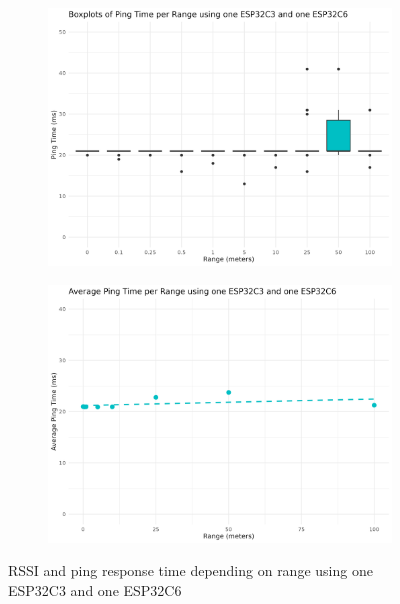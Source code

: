 \begin{figure}[H]
    \begin{subfigure}{0.45\textwidth}
        \includegraphics[width=\linewidth]{rstudio/analysis/plots/ESP32C36_ping_box.png}
    \end{subfigure}
    \begin{subfigure}{0.45\textwidth}
        \includegraphics[width=\linewidth]{rstudio/analysis/plots/ESP32C36_avg_ping.png}
    \end{subfigure}
    \vspace{\ftspace}
    \caption{RSSI and ping response time depending on range using one ESP32C3 and one ESP32C6}
    \label{fig:rssipingrange_esp32c36}
\end{figure}

